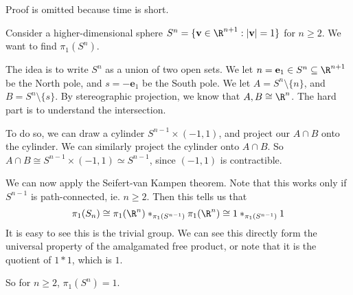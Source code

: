 \documentclass[a4paper]{article}
\begin{document}
Proof is omitted because time is short.

\begin{eg}
  Consider a higher-dimensional sphere $S^n = \{\mathbf{v} \in \R^{n + 1}: |\mathbf{v}| = 1\}$ for $n \geq 2$. We want to find $\pi_1(S^n)$.

  The idea is to write $S^n$ as a union of two open sets. We let $n = \mathbf{e}_1 \in S^n \subseteq \R^{n + 1}$ be the North pole, and $s = -\mathbf{e}_1$ be the South pole. We let $A = S^n \setminus \{n\}$, and $B = S^n \setminus\{s\}$. By stereographic projection, we know that $A, B \cong \R^n$. The hard part is to understand the intersection.

  To do so, we can draw a cylinder $S^{n - 1} \times (-1, 1)$, and project our $A\cap B$ onto the cylinder. We can similarly project the cylinder onto $A\cap B$. So $A\cap B\cong S^{n - 1} \times (-1, 1) \simeq S^{n - 1}$, since $(-1, 1)$ is contractible.
  \begin{center}
  \end{center}
  We can now apply the Seifert-van Kampen theorem. Note that this works only if $S^{n - 1}$ is path-connected, ie. $n \geq 2$. Then this tells us that
  \[
    \pi_1(S_n) \cong \pi_1(\R^n) *_{\pi_1(S^{n - 1})} \pi_1(\R^n) \cong 1 *_{\pi_1(S^{n - 1})} 1
  \]
  It is easy to see this is the trivial group. We can see this directly form the universal property of the amalgamated free product, or note that it is the quotient of $1 * 1$, which is $1$.

  So for $n \geq 2$, $\pi_1(S^n) = 1$.
\end{eg}
\end{document}
